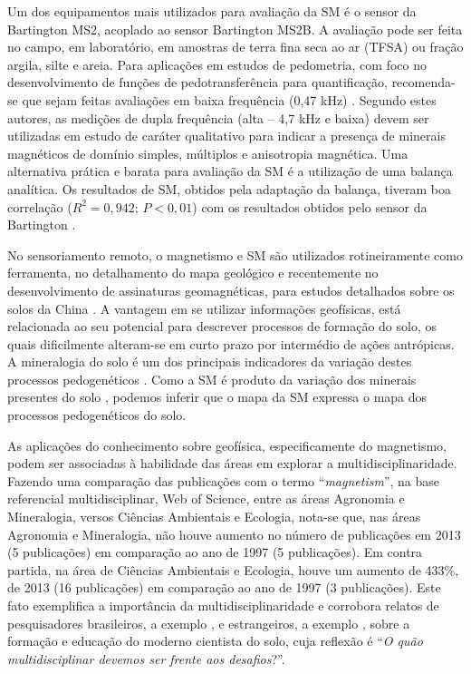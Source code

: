Um dos equipamentos mais utilizados para avaliação da SM é o sensor da Bartington MS2, acoplado ao sensor Bartington MS2B. A avaliação pode ser feita no campo, em laboratório, em amostras de terra fina seca ao ar (TFSA) ou fração argila, silte e areia. Para aplicações em estudos de pedometria, com foco no desenvolvimento de funções de pedotransferência para quantificação, recomenda-se que sejam feitas avaliações em baixa frequência (0,47 kHz) \citep{dearing:1994}. Segundo estes autores, as medições de dupla frequência (alta – 4,7 kHz e baixa) devem ser utilizadas em estudo de caráter qualitativo para indicar a presença de minerais magnéticos de domínio simples, múltiplos e anisotropia magnética. Uma alternativa prática e barata para avaliação da SM é a utilização de uma balança analítica. Os resultados de SM, obtidos pela adaptação da balança, tiveram boa correlação ($R^{2}=0,942;\,P<0,01$) com os resultados obtidos pelo sensor da Bartington \citep{siqueira:2010}.




No sensoriamento remoto, o magnetismo e SM são utilizados rotineiramente como ferramenta, no detalhamento do mapa geológico \citep{ruy:2006} e recentemente no desenvolvimento de assinaturas geomagnéticas, para estudos detalhados sobre os solos da China \citep{xia:2007}. A vantagem em se utilizar informações geofísicas, está relacionada ao seu potencial para descrever processos de formação do solo, os quais dificilmente alteram-se em curto prazo por intermédio de ações antrópicas. A mineralogia do solo é um dos principais indicadores da variação destes processos pedogenéticos \citep{camargo:2013}. Como a SM é produto da variação dos minerais presentes do solo \citep{siqueira:2013}, podemos inferir que o mapa da SM expressa o mapa dos processos pedogenéticos do solo.




As aplicações do conhecimento sobre geofísica, especificamente do magnetismo, podem ser associadas à habilidade das áreas em explorar a multidisciplinaridade. Fazendo uma comparação das publicações com o termo ``\textit{magnetism}'', na base referencial multidisciplinar, Web of Science, entre as áreas Agronomia e Mineralogia, versos Ciências Ambientais e Ecologia, nota-se que, nas áreas Agronomia e Mineralogia, não houve aumento no número de publicações em 2013 (5 publicações) em comparação ao ano de 1997 (5 publicações). Em contra partida, na área de Ciências Ambientais e Ecologia, houve um aumento de 433\%, de 2013 (16 publicações) em comparação ao ano de 1997 (3 publicações). Este fato exemplifica a importância da multidisciplinaridade e corrobora relatos de pesquisadores brasileiros, a exemplo \cite{vidal-torrado:2005}, e estrangeiros, a exemplo \cite{grunwald:2011}, sobre a formação e educação do moderno cientista do solo, cuja reflexão é ``\textit{O quão multidisciplinar devemos ser frente aos desafios}?''.




